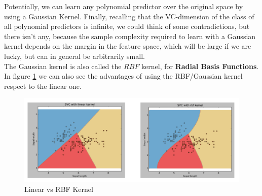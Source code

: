 \documentclass[12pt]{report}
\theoremstyle{plain}
\begin{document}
\begin{flushleft}
Potentially, we can learn any polynomial predictor over the original space by using a Gaussian Kernel. Finally, recalling that the VC-dimension of the class of all polynomial predictors is infinite, we could think of some contradictions, but there isn't any, because the sample complexity required to learn with a Gaussian kernel depends on the margin in the feature space, which will be large if we are lucky, but can in general be arbitrarily small.\\
The Gaussian kernel is also called the $RBF$ kernel, for \textbf{Radial Basis Functions}.\\
In figure \ref{fig:kernel_linear_vs_RBF} we can also see the advantages of using the RBF/Gaussian kernel respect to the linear one.
\begin{figure}[!h]
	\centering
	\includegraphics[scale=0.6]{images/kernel_linear_RBF.pdf}
	\caption{Linear vs RBF Kernel}
	\label{fig:kernel_linear_vs_RBF}
\end{figure}


\end{flushleft}
\end{document}
